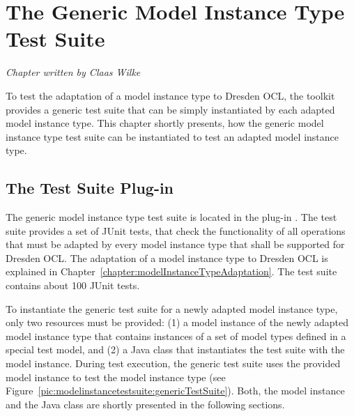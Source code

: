\chapter{The Generic Model Instance Type Test Suite}
\label{chapter:modelInstanceTestSuite}

\begin{flushright}
\textit{Chapter written by Claas Wilke}
\end{flushright}

To test the adaptation of a model instance type to Dresden OCL, the toolkit
provides a generic test suite that can be simply instantiated by each adapted 
model instance type. This chapter shortly presents, how the generic model
instance type test suite can be instantiated to test an adapted model 
instance type.



\section{The Test Suite Plug-in}

The generic model instance type test suite is located in the plug-in
.
The test suite provides a set of JUnit tests, that check the functionality of
all operations that must be adapted by every model instance type that
shall be supported for Dresden OCL. The adaptation of a model instance type
to Dresden OCL is explained in Chapter~\ref{chapter:modelInstanceTypeAdaptation}.  
The test suite contains about 100 JUnit tests.

To instantiate the generic test suite for a newly adapted model instance type,
only two resources must be provided: (1) a model instance of the newly adapted 
model instance type that contains instances of a set of model types defined in a
special test model, and (2) a Java class that instantiates the test suite with 
the model instance. During test execution, the generic test suite uses the
provided model instance to test the model instance type (see 
Figure~\ref{pic:modelinstancetestsuite:genericTestSuite}). Both, the model
instance and the Java class are shortly presented in the following sections.

